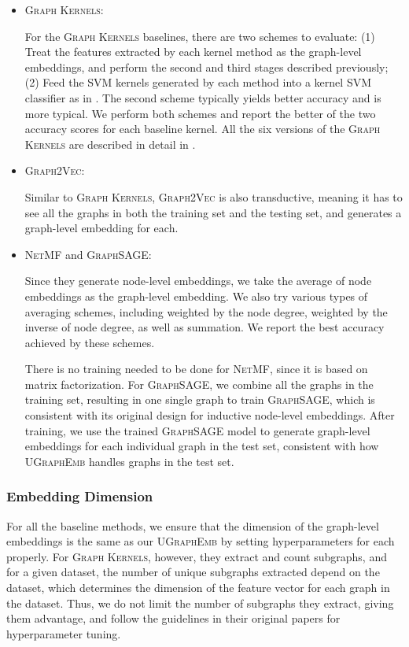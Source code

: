 \documentclass{article}
\newcommand{\model}{\textsc{UGraphEmb}\xspace}
\newcommand{\netmf}{\textsc{NetMF}\xspace}
\newcommand{\graphsage}{\textsc{GraphSAGE}\xspace}
\newcommand{\gk}{\textsc{Graph Kernels}\xspace}
\newcommand{\gv}{\textsc{Graph2Vec}\xspace}
\begin{document}
\begin{itemize}
    \item \gk:
    
    For the \gk baselines, there are two schemes to evaluate: (1) Treat the features extracted by each kernel method as the graph-level embeddings, and perform the second and third stages described previously; (2) Feed the SVM kernels generated by each method into a kernel SVM classifier as in \cite{yanardag2015deep}. The second scheme typically yields better accuracy and is more typical. We perform both schemes and report the better of the two accuracy scores for each baseline kernel. All the six versions of the \gk are described in detail in \cite{yanardag2015deep}.
    
    \item \gv: 
    
    Similar to \gk, \gv is also transductive, meaning it has to see all the graphs in both the training set and the testing set, and generates a graph-level embedding for each.
    
    \item \netmf and \graphsage:
    
    Since they generate node-level embeddings, we take the average of node embeddings as the graph-level embedding. We also try various types of averaging schemes, including weighted by the node degree, weighted by the inverse of node degree, as well as summation. We report the best accuracy achieved by these schemes.
    
    There is no training needed to be done for \netmf, since it is based on matrix factorization. For \graphsage, we combine all the graphs in the training set, resulting in one single graph to train \graphsage, which is consistent with its original design for inductive node-level embeddings. After training, we use the trained \graphsage model to generate graph-level embeddings for each individual graph in the test set, consistent with how \model handles graphs in the test set.
\end{itemize}

\subsubsection{Embedding Dimension}

For all the baseline methods, we ensure that the dimension of the graph-level embeddings is the same as our \model by setting hyperparameters for each properly. For \gk, however, they extract and count subgraphs, and for a given dataset, the number of unique subgraphs extracted depend on the dataset, which determines the dimension of the feature vector for each graph in the dataset. Thus, we do not limit the number of subgraphs they extract, giving them advantage, and follow the guidelines in their original papers for hyperparameter tuning. 
\end{document}
